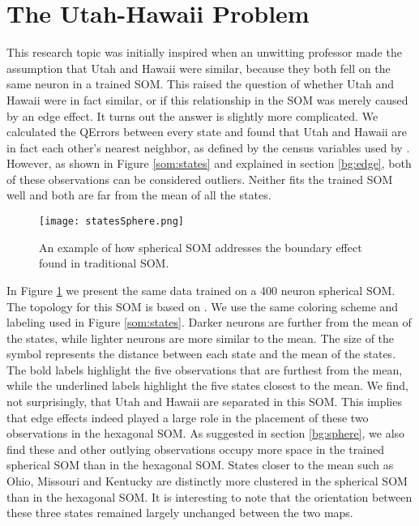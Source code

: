 

\section{The Utah-Hawaii Problem}
\label{states}
This research topic was initially inspired when an unwitting professor made
the assumption that Utah and Hawaii were similar, because they both fell on
the same neuron in a trained SOM.  This raised the question of whether Utah and
Hawaii were in fact similar, or if this relationship in the SOM was merely
caused by an edge effect.  It turns out the answer is slightly more
complicated.  We calculated the QErrors between every state and found that
Utah and Hawaii are in fact each other's nearest neighbor, as
defined by the census variables used by \cite{skupin08}.  However, as shown in
Figure \ref{som:states} and explained in section \ref{bg:edge}, both of these
observations can be considered outliers.  Neither fits the trained SOM well and both are
far from the mean of all the states.

\begin{figure}[h]
\centering
\texttt{[image: statesSphere.png]}
\begin{minipage}{5.42in}
\caption{An example of how spherical SOM addresses the boundary effect found in
traditional SOM.}
\label{sphere:states}
\end{minipage}
\end{figure}

In Figure \ref{sphere:states} we present the same data trained on a 400 neuron
spherical SOM.  The topology for this SOM is based on \cite{Rakhmanov94}.  We
use the same coloring scheme and labeling used in Figure \ref{som:states}.
Darker neurons are further from the mean of the states, while lighter neurons
are more similar to the mean.  The size of the symbol represents the distance
between each state and the mean of the states.  The bold labels highlight the
five observations that are furthest from the mean, while the underlined labels
highlight the five states closest to the mean.  We find, not surprisingly, that
Utah and Hawaii are separated in this SOM.  This implies that edge effects indeed
played a large role in the placement of these two observations in the hexagonal
SOM.  As suggested in section \ref{bg:sphere}, we also find these and other
outlying observations occupy more space in the trained spherical SOM than in
the hexagonal SOM.  States closer to the mean such as Ohio, Missouri and
Kentucky are distinctly more clustered in the spherical SOM than in
the hexagonal SOM.  It is interesting to note that the orientation between
these three states remained largely unchanged between the two maps.


